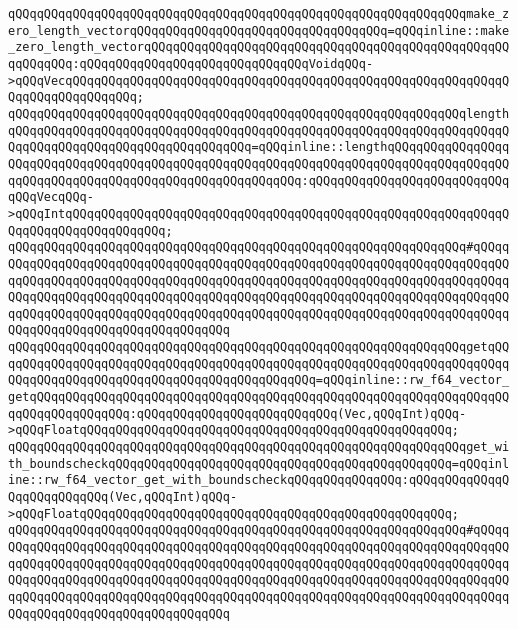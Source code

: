 \verb|qQQqqQQqqQQqqQQqqQQqqQQqqQQqqQQqqQQqqQQqqQQqqQQqqQQqqQQqqQQqqQQqmake_zero_length_vectorqQQqqQQqqQQqqQQqqQQqqQQqqQQqqQQqqQQq=qQQqinline::make_zero_length_vectorqQQqqQQqqQQqqQQqqQQqqQQqqQQqqQQqqQQqqQQqqQQqqQQqqQQqqQQqqQQq:qQQqqQQqqQQqqQQqqQQqqQQqqQQqqQQqVoidqQQq->qQQqVecqQQqqQQqqQQqqQQqqQQqqQQqqQQqqQQqqQQqqQQqqQQqqQQqqQQqqQQqqQQqqQQqqQQqqQQqqQQqqQQq;|\newline
\verb|qQQqqQQqqQQqqQQqqQQqqQQqqQQqqQQqqQQqqQQqqQQqqQQqqQQqqQQqqQQqqQQqlengthqQQqqQQqqQQqqQQqqQQqqQQqqQQqqQQqqQQqqQQqqQQqqQQqqQQqqQQqqQQqqQQqqQQqqQQqqQQqqQQqqQQqqQQqqQQqqQQqqQQqqQQq=qQQqinline::lengthqQQqqQQqqQQqqQQqqQQqqQQqqQQqqQQqqQQqqQQqqQQqqQQqqQQqqQQqqQQqqQQqqQQqqQQqqQQqqQQqqQQqqQQqqQQqqQQqqQQqqQQqqQQqqQQqqQQqqQQqqQQqqQQq:qQQqqQQqqQQqqQQqqQQqqQQqqQQqqQQqVecqQQq->qQQqIntqQQqqQQqqQQqqQQqqQQqqQQqqQQqqQQqqQQqqQQqqQQqqQQqqQQqqQQqqQQqqQQqqQQqqQQqqQQqqQQqqQQq;|\newline
\verb|qQQqqQQqqQQqqQQqqQQqqQQqqQQqqQQqqQQqqQQqqQQqqQQqqQQqqQQqqQQqqQQq#qQQqqQQqqQQqqQQqqQQqqQQqqQQqqQQqqQQqqQQqqQQqqQQqqQQqqQQqqQQqqQQqqQQqqQQqqQQqqQQqqQQqqQQqqQQqqQQqqQQqqQQqqQQqqQQqqQQqqQQqqQQqqQQqqQQqqQQqqQQqqQQqqQQqqQQqqQQqqQQqqQQqqQQqqQQqqQQqqQQqqQQqqQQqqQQqqQQqqQQqqQQqqQQqqQQqqQQqqQQqqQQqqQQqqQQqqQQqqQQqqQQqqQQqqQQqqQQqqQQqqQQqqQQqqQQqqQQqqQQqqQQqqQQqqQQqqQQqqQQqqQQqqQQqqQQqqQQq|\newline
\verb|qQQqqQQqqQQqqQQqqQQqqQQqqQQqqQQqqQQqqQQqqQQqqQQqqQQqqQQqqQQqqQQqgetqQQqqQQqqQQqqQQqqQQqqQQqqQQqqQQqqQQqqQQqqQQqqQQqqQQqqQQqqQQqqQQqqQQqqQQqqQQqqQQqqQQqqQQqqQQqqQQqqQQqqQQqqQQqqQQqqQQq=qQQqinline::rw_f64_vector_getqQQqqQQqqQQqqQQqqQQqqQQqqQQqqQQqqQQqqQQqqQQqqQQqqQQqqQQqqQQqqQQqqQQqqQQqqQQqqQQqqQQq:qQQqqQQqqQQqqQQqqQQqqQQqqQQq(Vec,qQQqInt)qQQq->qQQqFloatqQQqqQQqqQQqqQQqqQQqqQQqqQQqqQQqqQQqqQQqqQQqqQQqqQQq;|\newline
\verb|qQQqqQQqqQQqqQQqqQQqqQQqqQQqqQQqqQQqqQQqqQQqqQQqqQQqqQQqqQQqqQQqget_with_boundscheckqQQqqQQqqQQqqQQqqQQqqQQqqQQqqQQqqQQqqQQqqQQqqQQq=qQQqinline::rw_f64_vector_get_with_boundscheckqQQqqQQqqQQqqQQq:qQQqqQQqqQQqqQQqqQQqqQQqqQQq(Vec,qQQqInt)qQQq->qQQqFloatqQQqqQQqqQQqqQQqqQQqqQQqqQQqqQQqqQQqqQQqqQQqqQQqqQQq;|\newline
\verb|qQQqqQQqqQQqqQQqqQQqqQQqqQQqqQQqqQQqqQQqqQQqqQQqqQQqqQQqqQQqqQQq#qQQqqQQqqQQqqQQqqQQqqQQqqQQqqQQqqQQqqQQqqQQqqQQqqQQqqQQqqQQqqQQqqQQqqQQqqQQqqQQqqQQqqQQqqQQqqQQqqQQqqQQqqQQqqQQqqQQqqQQqqQQqqQQqqQQqqQQqqQQqqQQqqQQqqQQqqQQqqQQqqQQqqQQqqQQqqQQqqQQqqQQqqQQqqQQqqQQqqQQqqQQqqQQqqQQqqQQqqQQqqQQqqQQqqQQqqQQqqQQqqQQqqQQqqQQqqQQqqQQqqQQqqQQqqQQqqQQqqQQqqQQqqQQqqQQqqQQqqQQqqQQqqQQqqQQqqQQq|\newline
